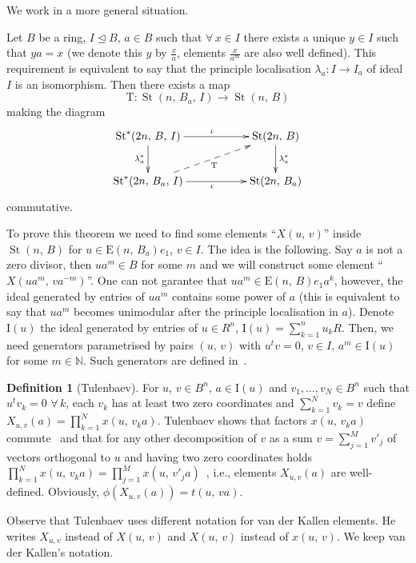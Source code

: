 \documentclass[11pt]{amsart}
\theoremstyle{plain} \declaretheorem[name=Theorem, Refname={Theorem,Theorems}]{tm} \Crefname{tm}{Theorem}{Theorems}
\numberwithin{equation}{section}
\theoremstyle{definition} \newtheorem{df}[lm]{Definition} \Crefname{df}{Definition}{Definitions}
\theoremstyle{remark} \newtheorem{rk}[lm]{Remark} \Crefname{rk}{Remark}{Remarks}
\newcommand{\E}{{\mathrm{E}}}
\newcommand{\St}{\mathop{\mathrm{St}}\nolimits}
\begin{document}
We work in a more general situation.

\begin{tm}
\label{a3map}
Let $B$ be a ring, $I\trianglelefteq B$, $a\in B$ such that $\forall\,x\in I$ there exists a unique $y\in I$ such that $ya=x$ {\rm(}we denote this $y$ by $\frac xa$, elements $\frac x{a^m}$ are also well defined{\rm)}. This requirement is equivalent to say that the principle localisation $\lambda_a\colon I\rightarrow I_a$ of ideal $I$ is an isomorphism. Then there exists a map
$$
\mathrm T\colon\St(n,\,B_a,\,I)\rightarrow\St(n,\,B)
$$
making the diagram
$$
\xymatrix{
\St^*(2n,\,B,\,I)\ar@<-0.0ex>[rr]^{\iota}\ar@<-0.0ex>[d]_{\lambda_{a}^*}&&\St(2n,\,B)\ar@<-0.0ex>[d]^{\lambda_{a}^*}\\
\St^*(2n,\,B_a,\,I)\ar@<-0.0ex>[rr]_{\iota}\ar@{-->}[rru]_{\mathrm T}&&\St(2n,\,B_a)
}
$$
commutative.
\end{tm}

To prove this theorem we need to find some elements ``$X(u,\,v)$'' inside $\St(n,\,B)$ for $u\in\E(n,\,B_a)e_1$, $v\in I$. The idea is the following. Say $a$ is not a zero divisor, then $ua^m\in B$ for some $m$ and we will construct some element ``$X(ua^m,\,va^{-m})$''. One can not garantee that $ua^m\in\E(n,\,B)e_1a^k$, however, the ideal generated by entries of $ua^m$ contains some power of $a$ (this is equivalent to say that $ua^m$ becomes unimodular after the principle localisation in $a$). Denote $\mathrm I(u)$ the ideal generated by entries of $u\in R^n$, $\mathrm I(u)=\sum\limits_{k=1}^nu_kR$. Then, we need generators parametrised by pairs $(u,\,v)$ with $u^tv=0$, $v\in I$, $a^m\in\mathrm I(u)$ for some $m\in\mathbb N$. Such generators are defined in~\cite{Tul}.

\begin{df}[Tulenbaev]
For $u$, $v\in B^n$, $a\in\mathrm I(u)$ and $v_1,\ldots,v_N\in B^n$ such that $u^tv_k=0$ $\forall\,k$,  each $v_k$ has at least two zero coordinates and $\sum_{k=1}^Nv_k=v$ define $X_{u,v}(a)=\prod\limits_{k=1}^Nx(u,\,v_ka)$. Tulenbaev shows that factors $x(u,\,v_ka)$ commute~\cite[Lem.~1.1\,e)]{Tul} and that for any other decomposition of $v$ as a sum $v=\sum_{j=1}^Mv'_j$ of vectors orthogonal to $u$ and having two zero coordinates holds $\prod_{k=1}^Nx(u,\,v_ka)=\prod_{j=1}^Mx(u,\,v'_ja)$~\cite[p.~3]{Tul}, i.e., elements $X_{u,v}(a)$ are well-defined. Obviously, $\phi(X_{u,v}(a))=t(u,\,va)$.
\end{df}

Observe that Tulenbaev uses different notation for van der Kallen elements. He writes $X_{u,v}$ instead of $X(u,\,v)$ and $X(u,\,v)$ instead of $x(u,\,v)$. We keep van der Kallen's notation.
\end{document}

